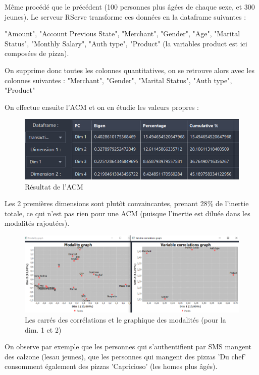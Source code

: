 Même procédé que le précédent (100 personnes plus âgées de chaque sexe, et 300 jeunes). Le
serveur RServe transforme ces données en la dataframe suivantes :

"Amount", "Account Previous State", "Merchant", "Gender", "Age", "Marital Status", "Monthly
Salary", "Auth type", "Product" (la variables product est ici composées de pizza).

On supprime donc toutes les colonnes quantitatives, on se retrouve alors avec les colonnes
suivantes : "Merchant", "Gender", "Marital Status", "Auth type", "Product"

On effectue ensuite l'ACM et on en étudie les valeurs propres :

\begin{figure}[H]
    \centering
    \includegraphics[width=\textwidth]{./img/thibault-Tests_Exemple_4.png}
    \caption{Résultat de l'ACM}
    \label{fig:thibault-ex-04}
\end{figure}

Les 2 premières dimensions sont plutôt convaincantes, prenant 28\% de l'inertie totale, ce qui n'est
pas rien pour une ACM (puisque l'inertie est diluée dans les modalités rajoutées).

\begin{figure}[H]
    \centering
    \includegraphics[width=\textwidth]{./img/thibault-Tests_Exemple_5.png}
    \caption{Les carrés des corrélations et le graphique des modalités (pour la dim. 1 et 2)}
    \label{fig:thibault-ex-05}
\end{figure}

On observe par exemple que les personnes qui s'authentifient par SMS mangent des calzone (lesau
jeunes), que les personnes qui mangent des pizzas 'Du chef' consomment également des pizzas
'Capricioso' (les homes plus âgés).


